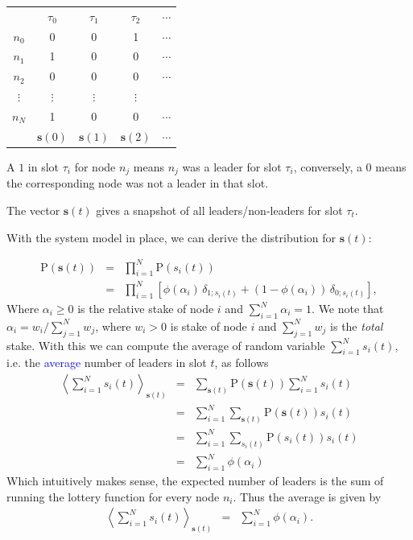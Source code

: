 \documentclass[10pt]{iopart}
\newcommand{\new}{\textcolor{blue}}
\newcommand{\1}{\mathbf{1}}
\newcommand{\Prob}{\mathrm{P}}
\newcommand{\sv}{\ensuremath{\mathbf{s}}}
\begin{document}
\begin{center}
\begin{tabular}{ c c c c c}
         & $\tau_0$     & $\tau_1$      & $\tau_2$      & $\cdots$ \\ 
   $n_0$ & 0            & 0             & 1             & $\cdots$ \\
   $n_1$ & 1            & 0             & 0             & $\cdots$ \\
   $n_2$ & 0            & 0             & 0             & $\cdots$ \\
$\vdots$ & $\vdots$     & $\vdots$      & $\vdots$      &          \\
   $n_N$ & 1            & 0             & 0             & $\cdots$ \\
         & $\sv(0)$  & $\sv(1)$   & $\sv(2)$   & $\cdots$ \\
\end{tabular}
\end{center}

A $1$ in slot $\tau_i$ for node $n_j$ means $n_j$ was a leader for slot $\tau_i$, conversely, a $0$ means the corresponding node was not a leader in that slot.

The vector $\sv(t)$ gives a snapshot of all leaders/non-leaders for slot $\tau_t$.

With the system model in place, we can derive the distribution for $\sv(t)$:

\begin{eqnarray}
\Prob(\sv(t))&=&\prod_{i=1}^N \Prob(s_i(t))\nonumber\\
&=&\prod_{i=1}^N\left[\phi(\alpha_i)\,\delta_{1;s_i(t)}+(1-\phi(\alpha_i))\,\delta_{0;s_i(t)}\right]\label{def:Prob-s},
\end{eqnarray}
%
Where $\alpha_i\geq0$ is the relative stake of node $i$ and $\sum_{i=1}^N\alpha_i=1$. We note that $\alpha_i=w_i/\sum_{j=1}^Nw_j$, where $w_i>0$
 is stake of node $i$ and $\sum_{j=1}^Nw_j$ is the \emph{total} stake.  With this we can compute the average of random variable $\sum_{i=1}^N s_i(t)$, i.e. the \new{average} number of leaders in slot $t$, as follows 
%
\begin{eqnarray}
%
\left\langle\sum_{i=1}^N s_i(t)\right\rangle_{\sv(t)}&=& \sum_{\sv(t)}\Prob(\sv(t))\sum_{i=1}^N s_i(t) \nonumber\\
&=&\sum_{i=1}^N \sum_{\sv(t)} \Prob(\sv(t))s_i(t)  \nonumber\\
&=&\sum_{i=1}^N \sum_{s_i(t)} \Prob(s_i(t))s_i(t)\nonumber \\
&=&\sum_{i=1}^N\phi(\alpha_i)
%
\end{eqnarray}
%
Which intuitively makes sense, the expected number of leaders is the sum of running the lottery function for every node $n_i$. Thus the average is given by 
%
\begin{eqnarray}
%
\left\langle\sum_{i=1}^N s_i(t)\right\rangle_{\sv(t)}
&=&\sum_{i=1}^N\phi(\alpha_i)\label{eqn:aver}.
%
\end{eqnarray}
%
\end{document}
